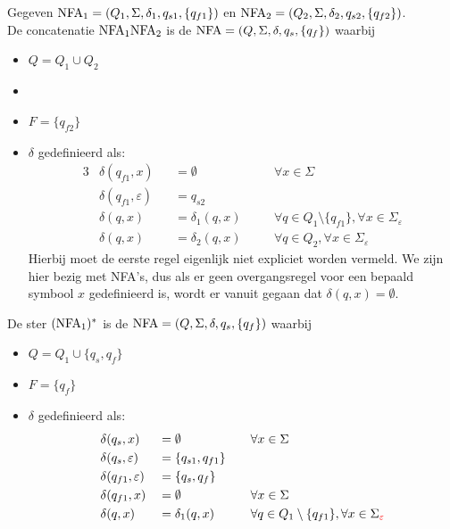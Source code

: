 \documentclass[../aanvullingen_cursus.tex]{subfiles}
\begin{document}
Gegeven \(\text{NFA}_1 = (Q_1,\Sigma,\delta_1,q_{s1},\{q_{f1}\})\) en \(\text{NFA}_2 = (Q_2,\Sigma,\delta_2,q_{s2},\{q_{f2}\})\). \\

De concatenatie \(\text{NFA}_1\text{NFA}_2\) is de \(\text{NFA} = (Q,\Sigma,\delta,q_s,\{q_f\})\) waarbij

\begin{itemize}
	\item \(Q = Q_1 \cup Q_2\)
	\item \rood[\( q_s=q_{s1} \)]
	\item \(F = \{q_{f2}\}\)
	\item \(\delta\) gedefinieerd als:
	\begin{alignat*}{3}
		& \delta(q_{f1}, x)           &  & = \emptyset      &  & \quad \forall x \in \Sigma                                                     \\
		& \delta(q_{f1}, \varepsilon) &  & = q_{s2}         &  &                                                                                \\
		& \delta(q, x)                &  & = \delta_1(q, x) &  & \quad \forall q \in Q_1 \setminus \{q_{f1}\}, \forall x \in \Sigma_\varepsilon \\
		& \delta(q, x)                &  & = \delta_2(q, x) &  & \quad \forall q \in Q_2, \forall x \in \Sigma_\varepsilon
	\end{alignat*}
	Hierbij moet de eerste regel eigenlijk niet expliciet worden vermeld. We zijn hier bezig met NFA's, dus als er geen overgangsregel voor een bepaald symbool \( x \) gedefinieerd is, wordt er vanuit gegaan dat \( \delta(q,x)=\emptyset \).
\end{itemize}

De ster \((\text{NFA}_1)^*\) is de \(\text{NFA} = (Q,\Sigma,\delta,q_s,\{q_f\})\) waarbij

\begin{itemize}
	\item \(Q = Q_1 \cup \{q_s,q_f\}\)
	\item \(F = \{q_{f}\}\)
	\item \(\delta\) gedefinieerd als:
	\begin{alignat*}{3}
		& \delta(q_{s}, x)            &  & = \emptyset         &  & \quad \forall x \in \Sigma                                \\
		& \delta(q_{s}, \varepsilon)  &  & = \{q_{s1},q_{f1}\} &  &                                                           \\
		& \delta(q_{f1}, \varepsilon) &  & = \{q_{s},q_{f}\}   &  &                                                           \\
		& \delta(q_{f1}, x)            &  & = \emptyset    &  & \quad \forall x \in \Sigma \\
		& \delta(q, x)                &  & = \delta_1(q, x)    &  & \quad \forall q \in Q_1 \setminus \{q_{f1}\}, \forall x \in \Sigma_{\rood[\varepsilon]}
	\end{alignat*}
\end{itemize}
\end{document}
